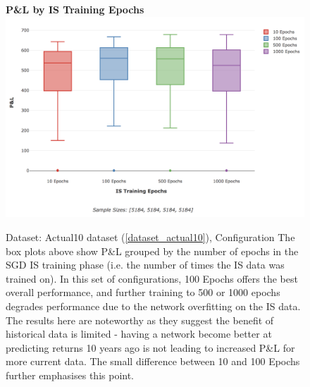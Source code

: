 \documentclass[a4paper,11pt,oneside]{article}
\theoremstyle{plain}
\theoremstyle{definition}
\begin{document}
\begin{figure}[H]
	\centering 
	\textbf{P\&L by IS Training Epochs}
	\includegraphics[scale=0.32]{images/results/data/max_epochs.png}
	\caption{
		Dataset: Actual10 dataset (\ref{dataset_actual10}), Configuration 
		\newline The box plots above show P\&L grouped by the number of epochs in the SGD IS training phase (i.e. the number of times the IS data was trained on). In this set of configurations, 100 Epochs offers the best overall performance, and further training to 500 or 1000 epochs degrades performance due to the network overfitting on the IS data. The results here are noteworthy as they suggest the benefit of historical data is limited - having a network become better at predicting returns 10 years ago is not leading to increased P\&L for more current data. The small difference between 10 and 100 Epochs further emphasises this point.
	}
	\label{figure-results_pl_max_epochs}
\end{figure}
\end{document}
